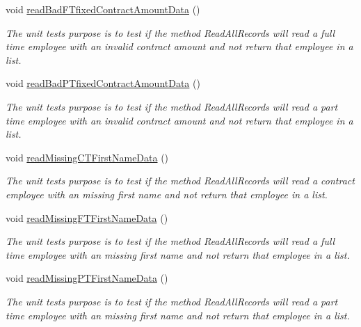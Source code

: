 \begin{DoxyCompactItemize}
void \hyperlink{class_file_i_o_tests_1_1_file_i_o_tests_a88d92a5da0f6478319611217bdcba396}{read\+Bad\+F\+Tfixed\+Contract\+Amount\+Data} ()
\begin{DoxyCompactList}\small\item\em The unit test\textquotesingle{}s purpose is to test if the method Read\+All\+Records will read a full time employee with an invalid contract amount and not return that employee in a list. \end{DoxyCompactList}\item 
void \hyperlink{class_file_i_o_tests_1_1_file_i_o_tests_a6ec660d41c990bb03db721493c55e6f7}{read\+Bad\+P\+Tfixed\+Contract\+Amount\+Data} ()
\begin{DoxyCompactList}\small\item\em The unit test\textquotesingle{}s purpose is to test if the method Read\+All\+Records will read a part time employee with an invalid contract amount and not return that employee in a list. \end{DoxyCompactList}\item 
void \hyperlink{class_file_i_o_tests_1_1_file_i_o_tests_a4b5f10c5a9a384b3e37d2de6fc34ea4c}{read\+Missing\+C\+T\+First\+Name\+Data} ()
\begin{DoxyCompactList}\small\item\em The unit test\textquotesingle{}s purpose is to test if the method Read\+All\+Records will read a contract employee with an missing first name and not return that employee in a list. \end{DoxyCompactList}\item 
void \hyperlink{class_file_i_o_tests_1_1_file_i_o_tests_a3b8f804ae1d432b8b9565c59d332a3d5}{read\+Missing\+F\+T\+First\+Name\+Data} ()
\begin{DoxyCompactList}\small\item\em The unit test\textquotesingle{}s purpose is to test if the method Read\+All\+Records will read a full time employee with an missing first name and not return that employee in a list. \end{DoxyCompactList}\item 
void \hyperlink{class_file_i_o_tests_1_1_file_i_o_tests_a18f69b088f8042a3e43cd43c7f4ab658}{read\+Missing\+P\+T\+First\+Name\+Data} ()
\begin{DoxyCompactList}\small\item\em The unit test\textquotesingle{}s purpose is to test if the method Read\+All\+Records will read a part time employee with an missing first name and not return that employee in a list. \end{DoxyCompactList}\item 

\end{DoxyCompactItemize}
